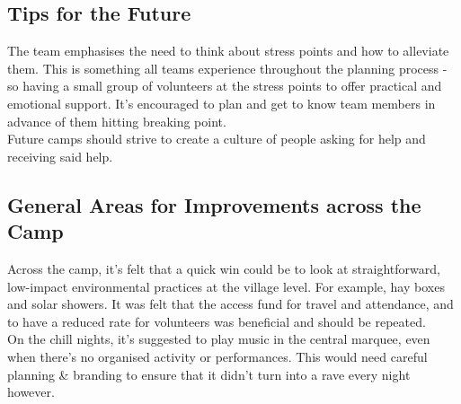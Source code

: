 \subsection{Tips for the Future}
The team emphasises the need to think about stress points and how to alleviate them. This is something all teams experience throughout the planning process - so having a small group of volunteers at the stress points to offer practical and emotional support. It's encouraged to plan and get to know team members in advance of them hitting breaking point.\\

Future camps should strive to create a culture of people asking for help and receiving said help.

\subsection{General Areas for Improvements across the Camp}
Across the camp, it's felt that a quick win could be to look at straightforward, low-impact environmental practices at the village level. For example, hay boxes and solar showers. It was felt that the access fund for travel and attendance, and to have a reduced rate for volunteers was beneficial and should be repeated.\\

On the chill nights, it's suggested to play music in the central marquee, even when there's no organised activity or performances. 	This would need careful planning \& branding to ensure that it didn't turn into a rave every night however.